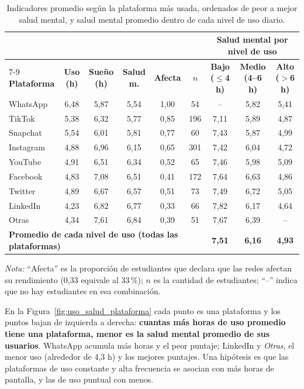 \documentclass[10pt,a4paper]{article}
\begin{document}
\begin{table}[H]
\centering
\footnotesize
\setlength{\tabcolsep}{4pt}
\caption{Indicadores promedio según la plataforma más usada, ordenados de peor a mejor salud mental, y
salud mental promedio dentro de cada nivel de uso diario.}
\label{tab:plataforma}
\begin{tabular}{l ccccc ccc}
\toprule
& & & & & & \multicolumn{3}{c}{\textbf{Salud mental por nivel de uso}} \\
\cmidrule(lr){7-9}
\textbf{Plataforma} & \textbf{Uso (h)} & \textbf{Sueño (h)} & \textbf{Salud m.} & \textbf{Afecta} & \textbf{$n$}
& \textbf{Bajo ($\leq$4 h)} & \textbf{Medio (4--6 h)} & \textbf{Alto ($>$6 h)} \\
\midrule
WhatsApp  & 6,48 & 5,87 & 5,54 & 1,00 & 54  & --   & 5,82 & 5,41 \\
TikTok    & 5,38 & 6,32 & 5,77 & 0,85 & 196 & 7,11 & 5,89 & 4,87 \\
Snapchat  & 5,54 & 6,01 & 5,81 & 0,77 & 60  & 7,43 & 5,87 & 4,99 \\
Instagram & 4,88 & 6,96 & 6,15 & 0,65 & 301 & 7,42 & 6,04 & 4,72 \\
YouTube   & 4,91 & 6,51 & 6,34 & 0,52 & 65  & 7,46 & 5,98 & 5,09 \\
Facebook  & 4,83 & 7,08 & 6,51 & 0,41 & 172 & 7,64 & 6,63 & 4,86 \\
Twitter   & 4,89 & 6,67 & 6,57 & 0,51 & 73  & 7,49 & 6,72 & 5,05 \\
LinkedIn  & 4,23 & 6,82 & 6,77 & 0,33 & 66  & 7,82 & 6,17 & 4,64 \\
Otras     & 4,34 & 7,61 & 6,84 & 0,39 & 51  & 7,67 & 6,39 & --   \\
\midrule
\multicolumn{6}{l}{\textbf{Promedio de cada nivel de uso (todas las plataformas)}} & \textbf{7,51} & \textbf{6,16} & \textbf{4,93} \\
\bottomrule
\end{tabular}

\smallskip
{\footnotesize\textit{Nota:} “Afecta” es la proporción de estudiantes que declara que las redes afectan su
rendimiento (0,33 equivale al 33\,\%); $n$ es la cantidad de estudiantes; “--” indica que no hay
estudiantes en esa combinación.}
\end{table}

En la Figura~\ref{fig:uso_salud_plataforma} cada punto es una plataforma y los puntos bajan de izquierda
a derecha: \textbf{cuantas más horas de uso promedio tiene una plataforma, menor es la salud mental promedio
de sus usuarios}. WhatsApp acumula más horas y el peor puntaje; LinkedIn y \emph{Otras}, el menor uso
(alrededor de 4,3 h) y los mejores puntajes. Una hipótesis es que las plataformas de uso constante y alta
frecuencia se asocian con más horas de pantalla, y las de uso puntual con menos.
\end{document}
